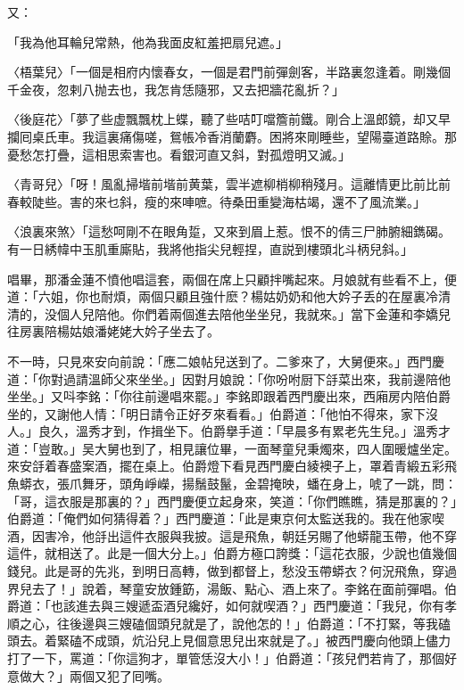 又：

\begin{myquote}
「我為他耳輪兒常熱，他為我面皮紅羞把扇兒遮。」

{\markfont〈梧葉兒〉}「一個是相府内懷春女，一個是君門前彈劍客，半路裏忽逢着。剛幾個千金夜，忽剌八抛去也，我怎肯恁隨邪，又去把牆花亂折？」

{\markfont〈後庭花〉}「夢了些虚飄飄枕上蝶，聽了些咭叮噹簷前鐵。剛合上溫郎鏡，却又早攔囘桌氏車。我這裏痛傷嗟，鴛帳冷香消蘭麝。困將來剛睡些，望陽臺道路賒。那憂愁怎打疊，這相思索害也。看銀河直又斜，對孤燈明又滅。」

{\markfont〈青哥兒〉}「呀！風亂掃堦前堦前黄葉，雲半遮柳梢柳稍殘月。這離情更比前比前春較陡些。害的來乜斜，瘦的來唓嗻。待桑田重變海枯竭，還不了風流業。」

{\markfont〈浪裏來煞〉}「這愁呵剛不在眼角踅，又來到眉上惹。恨不的倩三尸肺腑細鐫碣。有一日綉幃中玉肌重廝貼，我將他指尖兒輕捏，直説到樓頭北斗柄兒斜。」
\end{myquote}

唱畢，那潘金蓮不憤他唱這套，兩個在席上只顧拌嘴起來。月娘就有些看不上，便道：「六姐，你也耐煩，兩個只顧且強什麽？楊姑奶奶和他大妗子丢的在屋裏冷清清的，没個人兒陪他。你們着兩個進去陪他坐坐兒，我就來。」當下金蓮和李嬌兒往房裏陪楊姑娘潘姥姥大妗子坐去了。

不一時，只見來安向前說：「應二娘帖兒送到了。二爹來了，大舅便來。」西門慶道：「你對過請溫師父來坐坐。」因對月娘說：「你吩咐厨下㧱菜出來，我前邊陪他坐坐。」又呌李銘：「你往前邊唱來罷。」李銘即跟着西門慶出來，西廂房内陪伯爵坐的，又謝他人情：「明日請令正好歹來看看。」伯爵道：「他怕不得來，家下沒人。」良久，溫秀才到，作揖坐下。伯爵擧手道：「早晨多有累老先生兒。」溫秀才道：「豈敢。」吴大舅也到了，相見讓位畢，一面琴童兒秉燭來，四人圍暖爐坐定。來安㧱着春盛案酒，擺在桌上。伯爵燈下看見西門慶白綾襖子上，罩着青緞五彩飛魚蟒衣，張爪舞牙，頭角崢嶸，揚鬚鼓鬣，金碧掩映，蟠在身上，唬了一跳，問：「哥，這衣服是那裏的？」西門慶便立起身來，笑道：「你們瞧瞧，猜是那裏的？」伯爵道：「俺們如何猜得着？」西門慶道：「此是東京何太監送我的。我在他家喫酒，因害冷，他㧱出這件衣服與我披。這是飛魚，朝廷另賜了他蟒龍玉帶，他不穿這件，就相送了。此是一個大分上。」伯爵方極口誇獎：「這花衣服，少說也值幾個錢兒。此是哥的先兆，到明日高轉，做到都督上，愁没玉帶蟒衣？何況飛魚，穿過界兒去了！」說着，琴童安放鍾筯，湯飯、點心、酒上來了。李銘在面前彈唱。伯爵道：「也該進去與三嫂遞盃酒兒纔好，如何就喫酒？」西門慶道：「我兒，你有孝順之心，往後邊與三嫂磕個頭兒就是了，說他怎的！」伯爵道：「不打緊，等我磕頭去。着緊磕不成頭，炕沿兒上見個意思兒出來就是了。」被西門慶向他頭上儘力打了一下，罵道：「你這狗才，單管恁沒大小！」伯爵道：「孩兒們若肯了，那個好意做大？」兩個又犯了囘嘴。

